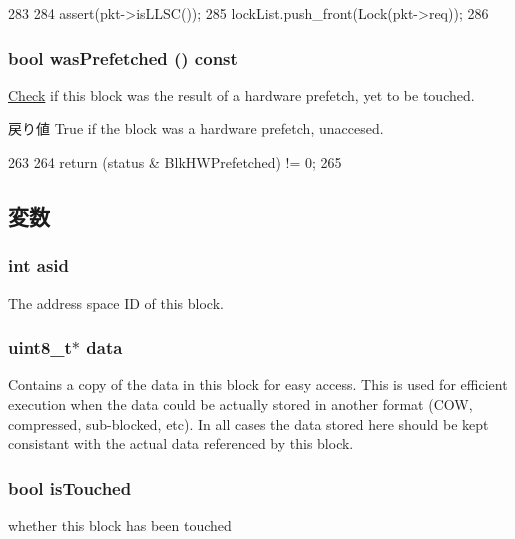 \begin{DoxyCode}
283     {
284         assert(pkt->isLLSC());
285         lockList.push_front(Lock(pkt->req));
286     }
\end{DoxyCode}
\hypertarget{classCacheBlk_a2f162efb4889fc082c1d83a4cc0bb222}{
\subsubsection[{wasPrefetched}]{\setlength{\rightskip}{0pt plus 5cm}bool wasPrefetched () const}}
\label{classCacheBlk_a2f162efb4889fc082c1d83a4cc0bb222}
\hyperlink{classCheck}{Check} if this block was the result of a hardware prefetch, yet to be touched. \begin{DoxyReturn}{戻り値}
True if the block was a hardware prefetch, unaccesed. 
\end{DoxyReturn}



\begin{DoxyCode}
263     {
264         return (status & BlkHWPrefetched) != 0;
265     }
\end{DoxyCode}


\subsection{変数}
\hypertarget{classCacheBlk_a3651868e9554e283ffdc0fb7631a934b}{
\subsubsection[{asid}]{\setlength{\rightskip}{0pt plus 5cm}int {\bf asid}}}
\label{classCacheBlk_a3651868e9554e283ffdc0fb7631a934b}
The address space ID of this block. \hypertarget{classCacheBlk_abe222f6d3581e7920dcad5306cc906a8}{
\subsubsection[{data}]{\setlength{\rightskip}{0pt plus 5cm}uint8\_\-t$\ast$ {\bf data}}}
\label{classCacheBlk_abe222f6d3581e7920dcad5306cc906a8}
Contains a copy of the data in this block for easy access. This is used for efficient execution when the data could be actually stored in another format (COW, compressed, sub-\/blocked, etc). In all cases the data stored here should be kept consistant with the actual data referenced by this block. \hypertarget{classCacheBlk_a0d3f1758bf7fdcec892f211bf3553d4f}{
\subsubsection[{isTouched}]{\setlength{\rightskip}{0pt plus 5cm}bool {\bf isTouched}}}
\label{classCacheBlk_a0d3f1758bf7fdcec892f211bf3553d4f}
whether this block has been touched 

